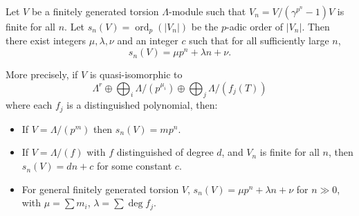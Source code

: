 Let $V$ be a finitely generated torsion $\Lambda$-module such that $V_n = V/(\gamma^{p^n}-1)V$ is finite for all $n$. Let $s_n(V) = \operatorname{ord}_p(|V_n|)$ be the $p$-adic order of $|V_n|$. Then there exist integers $\mu, \lambda, \nu$ and an integer $c$ such that for all sufficiently large $n$,
$$s_n(V) = \mu p^n + \lambda n + \nu.$$

More precisely, if $V$ is quasi-isomorphic to
$$\Lambda^r \oplus \bigoplus_i \Lambda/(p^{\mu_i}) \oplus \bigoplus_j \Lambda/(f_j(T))$$
where each $f_j$ is a distinguished polynomial, then:
\begin{itemize}
\item[(i)] If $V = \Lambda/(p^m)$ then $s_n(V) = m p^n$.
\item[(ii)] If $V = \Lambda/(f)$ with $f$ distinguished of degree $d$, and $V_n$ is finite for all $n$, then $s_n(V) = d n + c$ for some constant $c$.
\item[(iii)] For general finitely generated torsion $V$, $s_n(V) = \mu p^n + \lambda n + \nu$ for $n \gg 0$, with $\mu = \sum m_i$, $\lambda = \sum \deg f_j$.
\end{itemize}
